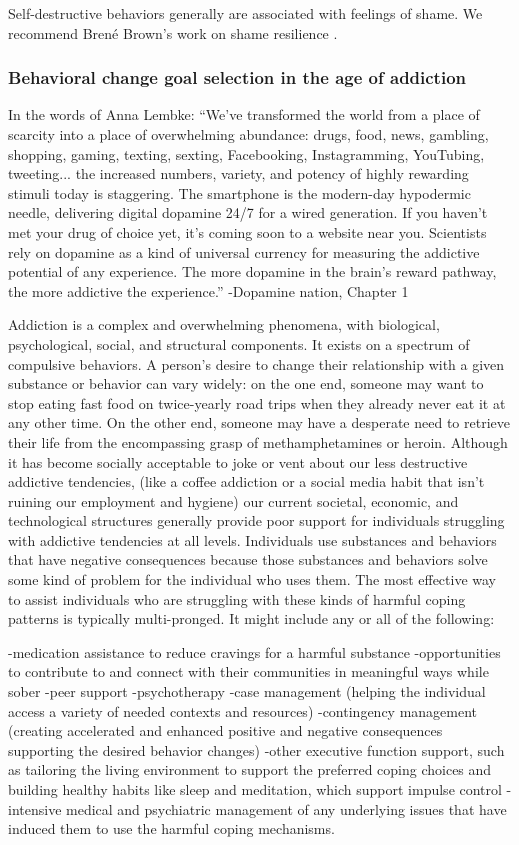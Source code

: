 \documentclass[12pt,letterpaper]{article}
\begin{document}
Self-destructive behaviors generally are associated with feelings of shame. We recommend Brené Brown's work on shame resilience \cite{brownThought}.

\subsubsection*{Behavioral change goal selection in the age of addiction}

In the words of Anna Lembke: “We've transformed the world from a place of scarcity into a place of overwhelming abundance: drugs, food, news, gambling, shopping, gaming, texting, sexting, Facebooking, Instagramming, YouTubing, tweeting... the increased numbers, variety, and potency of highly rewarding stimuli today is staggering. The smartphone is the modern-day hypodermic needle, delivering digital dopamine 24/7 for a wired generation. If you haven't met your drug of choice yet, it's coming soon to a website near you. Scientists rely on dopamine as a kind of universal currency for measuring the addictive potential of any experience. The more dopamine in the brain's reward pathway, the more addictive the experience.” -Dopamine nation, Chapter 1

Addiction is a complex and overwhelming phenomena, with biological, psychological, social, and structural components. It exists on a spectrum of compulsive behaviors. A person's desire to change their relationship with a given substance or behavior can vary widely: on the one end, someone may want to stop eating fast food on twice-yearly road trips when they already never eat it at any other time. On the other end, someone may have a desperate need to retrieve their life from the encompassing grasp of methamphetamines or heroin. Although it has become socially acceptable to joke or vent about our less destructive addictive tendencies, (like a coffee addiction or a social media habit that isn't ruining our employment and hygiene) our current societal, economic, and technological structures generally provide poor support for individuals struggling with addictive tendencies at all levels. Individuals use substances and behaviors that have negative consequences because those substances and behaviors solve some kind of problem for the individual who uses them. The most effective way to assist individuals who are struggling with these kinds of harmful coping patterns is typically multi-pronged. It might include any or all of the following:

-medication assistance to reduce cravings for a harmful substance
-opportunities to contribute to and connect with their communities in meaningful ways while sober
-peer support
-psychotherapy
-case management (helping the individual access a variety of needed contexts and resources)
-contingency management (creating accelerated and enhanced positive and negative consequences supporting the desired behavior changes) 
-other executive function support, such as tailoring the living environment to support the preferred coping choices and building healthy habits like sleep and meditation, which support impulse control
-intensive medical and psychiatric management of any underlying issues that have induced them to use the harmful coping mechanisms.
\end{document}
